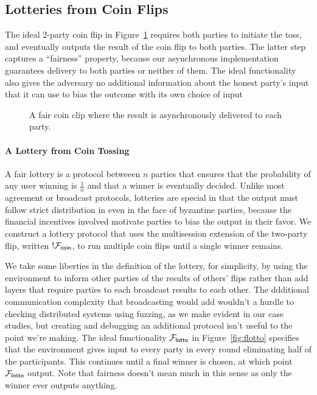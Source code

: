\subsection{Lotteries from Coin Flips}
The ideal 2-party coin flip in Figure~\ref{fig:fcoin} requires both parties to
initiate the toss, and eventually outputs the result of the coin flip to both
parties.  The latter step captures a ``fairness'' property, because our
asynchronous implementation guarantees delivery to both parties or neither of
them.  The ideal functionality also gives the adversary no additional
information about the honest party's input that it can use to bias the outcome
with its own choice of input

\begin{figure}
\centering

\caption{A fair coin clip where the result is asynchronously delivered to each party.}
\label{fig:fcoin}
\end{figure}


\paragraph{A Lottery from Coin Tossing}
A fair lottery is a protocol betweeen $n$ parties that ensures that the
probability of any user winning is $\frac{1}{n}$ and that a winner is
eventually decided.  Unlike most agreement or broadcast protocols, lotteries
are special in that the output must follow strict distribution in even in
the face of byzantine parties, because the financial incentives involved
motivate parties to bias the output in their favor.  We construct a lottery
protocol that uses the multisession extension of the two-party flip, written
$!\mathcal{F}_{{\mathsf {coin}}}$, to run multiple coin flips until a single winner remains. 

We take some liberties in the definition of the lottery, for simplicity, by
using the environment to inform other parties of the results of others' flips
rather than add layers that require parties to each broadcast results to each other.
The ddditional communication complexity that broadcasting would add wouldn't a hurdle to checking distributed
systems using fuzzing, as we make evident in our case studies, but creating and debugging
an additional protocol isn't useful to the point we're making.
The ideal functionality $\mathcal{F}_{{\mathsf {lotto}}}$ in Figure~\ref{fig:flotto} specifies
that the environment gives input to every party in every round eliminating half
of the participants.  This continues until a final winner is chosen, at which
point $\mathcal{F}_{{\mathsf {lotto}}}$ output. Note that fairness doesn't mean much in this sense
as only the winner ever outputs anything.

